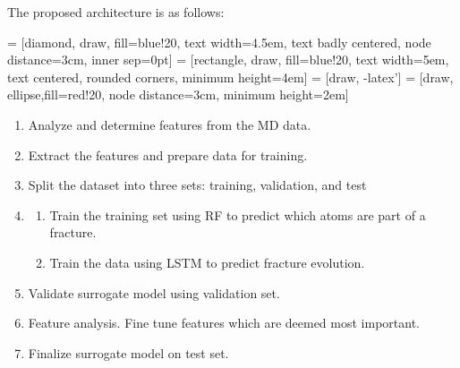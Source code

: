 The proposed architecture is as follows:

\bigskip

\begin{center}
 = [diamond, draw, fill=blue!20, 
    text width=4.5em, text badly centered, node distance=3cm, inner sep=0pt]
 = [rectangle, draw, fill=blue!20, 
    text width=5em, text centered, rounded corners, minimum height=4em]
 = [draw, -latex']
 = [draw, ellipse,fill=red!20, node distance=3cm,
    minimum height=2em]
    
\end{center}

\begin{enumerate}
    \item Analyze and determine features from the MD data.
    \item Extract the features and prepare data for training.
    \item Split the dataset into three sets: training, validation, and test
    \item
    \begin{enumerate}
        \item Train the training set using RF to predict which atoms are part of a fracture.
        \item Train the data using LSTM to predict fracture evolution.
    \end{enumerate}
    \item Validate surrogate model using validation set.
    \item Feature analysis. Fine tune features which are deemed most important. 
    \item Finalize surrogate model on test set. 
\end{enumerate}